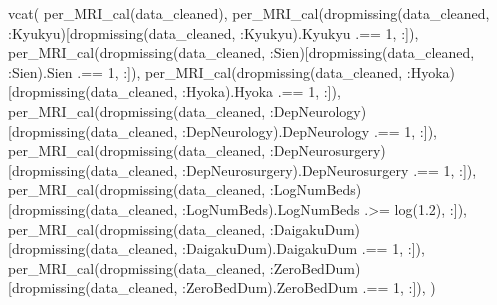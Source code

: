 \documentclass[
  letterpaper,
  DIV=11,
  numbers=noendperiod]{scrreprt}
\newenvironment{Shaded}{\begin{snugshade}}{\end{snugshade}}
\newcommand{\FloatTok}[1]{\textcolor[rgb]{0.68,0.00,0.00}{#1}}
\newcommand{\FunctionTok}[1]{\textcolor[rgb]{0.28,0.35,0.67}{#1}}
\newcommand{\NormalTok}[1]{\textcolor[rgb]{0.00,0.23,0.31}{#1}}
\newcommand{\OperatorTok}[1]{\textcolor[rgb]{0.37,0.37,0.37}{#1}}
\begin{document}
\begin{Shaded}
\begin{Highlighting}[]
\FunctionTok{vcat}\NormalTok{(}
    \FunctionTok{per\_MRI\_cal}\NormalTok{(data\_cleaned),}
    \FunctionTok{per\_MRI\_cal}\NormalTok{(}\FunctionTok{dropmissing}\NormalTok{(data\_cleaned, }\OperatorTok{:}\NormalTok{Kyukyu)[}\FunctionTok{dropmissing}\NormalTok{(data\_cleaned, }\OperatorTok{:}\NormalTok{Kyukyu).Kyukyu }\OperatorTok{.==} \FloatTok{1}\NormalTok{, }\OperatorTok{:}\NormalTok{]),}
    \FunctionTok{per\_MRI\_cal}\NormalTok{(}\FunctionTok{dropmissing}\NormalTok{(data\_cleaned, }\OperatorTok{:}\NormalTok{Sien)[}\FunctionTok{dropmissing}\NormalTok{(data\_cleaned, }\OperatorTok{:}\NormalTok{Sien).Sien }\OperatorTok{.==} \FloatTok{1}\NormalTok{, }\OperatorTok{:}\NormalTok{]),}
    \FunctionTok{per\_MRI\_cal}\NormalTok{(}\FunctionTok{dropmissing}\NormalTok{(data\_cleaned, }\OperatorTok{:}\NormalTok{Hyoka)[}\FunctionTok{dropmissing}\NormalTok{(data\_cleaned, }\OperatorTok{:}\NormalTok{Hyoka).Hyoka }\OperatorTok{.==} \FloatTok{1}\NormalTok{, }\OperatorTok{:}\NormalTok{]),}
    \FunctionTok{per\_MRI\_cal}\NormalTok{(}\FunctionTok{dropmissing}\NormalTok{(data\_cleaned, }\OperatorTok{:}\NormalTok{DepNeurology)[}\FunctionTok{dropmissing}\NormalTok{(data\_cleaned, }\OperatorTok{:}\NormalTok{DepNeurology).DepNeurology }\OperatorTok{.==} \FloatTok{1}\NormalTok{, }\OperatorTok{:}\NormalTok{]),}
    \FunctionTok{per\_MRI\_cal}\NormalTok{(}\FunctionTok{dropmissing}\NormalTok{(data\_cleaned, }\OperatorTok{:}\NormalTok{DepNeurosurgery)[}\FunctionTok{dropmissing}\NormalTok{(data\_cleaned, }\OperatorTok{:}\NormalTok{DepNeurosurgery).DepNeurosurgery }\OperatorTok{.==} \FloatTok{1}\NormalTok{, }\OperatorTok{:}\NormalTok{]),}
    \FunctionTok{per\_MRI\_cal}\NormalTok{(}\FunctionTok{dropmissing}\NormalTok{(data\_cleaned, }\OperatorTok{:}\NormalTok{LogNumBeds)[}\FunctionTok{dropmissing}\NormalTok{(data\_cleaned, }\OperatorTok{:}\NormalTok{LogNumBeds).LogNumBeds }\OperatorTok{.\textgreater{}=} \FunctionTok{log}\NormalTok{(}\FloatTok{1.2}\NormalTok{), }\OperatorTok{:}\NormalTok{]),}
    \FunctionTok{per\_MRI\_cal}\NormalTok{(}\FunctionTok{dropmissing}\NormalTok{(data\_cleaned, }\OperatorTok{:}\NormalTok{DaigakuDum)[}\FunctionTok{dropmissing}\NormalTok{(data\_cleaned, }\OperatorTok{:}\NormalTok{DaigakuDum).DaigakuDum }\OperatorTok{.==} \FloatTok{1}\NormalTok{, }\OperatorTok{:}\NormalTok{]),}
    \FunctionTok{per\_MRI\_cal}\NormalTok{(}\FunctionTok{dropmissing}\NormalTok{(data\_cleaned, }\OperatorTok{:}\NormalTok{ZeroBedDum)[}\FunctionTok{dropmissing}\NormalTok{(data\_cleaned, }\OperatorTok{:}\NormalTok{ZeroBedDum).ZeroBedDum }\OperatorTok{.==} \FloatTok{1}\NormalTok{, }\OperatorTok{:}\NormalTok{]),}
\NormalTok{)}
\end{Highlighting}
\end{Shaded}
\end{document}
